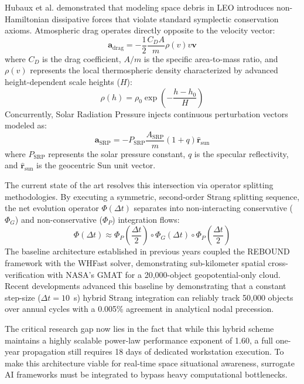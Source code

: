 \documentclass[11pt,letterpaper]{article}
\begin{document}
Hubaux et al. demonstrated that modeling space debris in LEO introduces non-Hamiltonian dissipative forces that violate standard symplectic conservation axioms. Atmospheric drag operates directly opposite to the velocity vector:
\begin{equation}
    \mathbf{a}_{\text{drag}} = -\frac{1}{2}\frac{C_D A}{m} \rho(v) v \mathbf{v}
\end{equation}
where $C_D$ is the drag coefficient, $A/m$ is the specific area-to-mass ratio, and $\rho(v)$ represents the local thermospheric density characterized by advanced height-dependent scale heights ($H$):
\begin{equation}
    \rho(h) = \rho_0 \exp\left(-\frac{h - h_0}{H}\right)
\end{equation}
Concurrently, Solar Radiation Pressure injects continuous perturbation vectors modeled as:
\begin{equation}
    \mathbf{a}_{\text{SRP}} = -P_{\text{SRP}} \frac{A_{\text{SRP}}}{m} (1+q) \hat{\mathbf{r}}_{\text{sun}}
\end{equation}
where $P_{\text{SRP}}$ represents the solar pressure constant, $q$ is the specular reflectivity, and $\hat{\mathbf{r}}_{\text{sun}} $ is the geocentric Sun unit vector.

The current state of the art resolves this intersection via operator splitting methodologies. By executing a symmetric, second-order Strang splitting sequence, the net evolution operator $\Phi(\Delta t)$ separates into non-interacting conservative ($\Phi_G$) and non-conservative ($\Phi_P$) integration flows:
\begin{equation}
    \Phi(\Delta t) \approx \Phi_P\left(\frac{\Delta t}{2}\right) \circ \Phi_G(\Delta t) \circ \Phi_P\left(\frac{\Delta t}{2}\right)
\end{equation}
The baseline architecture established in previous years coupled the REBOUND framework with the WHFast solver, demonstrating sub-kilometer spatial cross-verification with NASA's GMAT for a 20,000-object geopotential-only cloud. Recent developments advanced this baseline by demonstrating that a constant step-size ($\Delta t = 10$~s) hybrid Strang integration can reliably track 50,000 objects over annual cycles with a 0.005\% agreement in analytical nodal precession. 

The critical research gap now lies in the fact that while this hybrid scheme maintains a highly scalable power-law performance exponent of 1.60, a full one-year propagation still requires 18 days of dedicated workstation execution. To make this architecture viable for real-time space situational awareness, surrogate AI frameworks must be integrated to bypass heavy computational bottlenecks.
\end{document}
